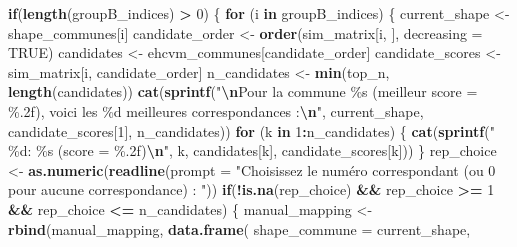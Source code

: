 \documentclass[
]{article}
\newenvironment{Shaded}{\begin{snugshade}}{\end{snugshade}}
\newcommand{\AttributeTok}[1]{\textcolor[rgb]{0.13,0.29,0.53}{#1}}
\newcommand{\ConstantTok}[1]{\textcolor[rgb]{0.56,0.35,0.01}{#1}}
\newcommand{\ControlFlowTok}[1]{\textcolor[rgb]{0.13,0.29,0.53}{\textbf{#1}}}
\newcommand{\DecValTok}[1]{\textcolor[rgb]{0.00,0.00,0.81}{#1}}
\newcommand{\FunctionTok}[1]{\textcolor[rgb]{0.13,0.29,0.53}{\textbf{#1}}}
\newcommand{\NormalTok}[1]{#1}
\newcommand{\OtherTok}[1]{\textcolor[rgb]{0.56,0.35,0.01}{#1}}
\newcommand{\SpecialCharTok}[1]{\textcolor[rgb]{0.81,0.36,0.00}{\textbf{#1}}}
\newcommand{\StringTok}[1]{\textcolor[rgb]{0.31,0.60,0.02}{#1}}
\begin{document}
\begin{Shaded}
\begin{Highlighting}[]
  \ControlFlowTok{if}\NormalTok{(}\FunctionTok{length}\NormalTok{(groupB\_indices) }\SpecialCharTok{\textgreater{}} \DecValTok{0}\NormalTok{) \{}
    \ControlFlowTok{for}\NormalTok{ (i }\ControlFlowTok{in}\NormalTok{ groupB\_indices) \{}
\NormalTok{      current\_shape }\OtherTok{\textless{}{-}}\NormalTok{ shape\_communes[i]}
\NormalTok{      candidate\_order }\OtherTok{\textless{}{-}} \FunctionTok{order}\NormalTok{(sim\_matrix[i, ], }\AttributeTok{decreasing =} \ConstantTok{TRUE}\NormalTok{)}
\NormalTok{      candidates }\OtherTok{\textless{}{-}}\NormalTok{ ehcvm\_communes[candidate\_order]}
\NormalTok{      candidate\_scores }\OtherTok{\textless{}{-}}\NormalTok{ sim\_matrix[i, candidate\_order]}
\NormalTok{      n\_candidates }\OtherTok{\textless{}{-}} \FunctionTok{min}\NormalTok{(top\_n, }\FunctionTok{length}\NormalTok{(candidates))}
      \FunctionTok{cat}\NormalTok{(}\FunctionTok{sprintf}\NormalTok{(}\StringTok{"}\SpecialCharTok{\textbackslash{}n}\StringTok{Pour la commune \textquotesingle{}\%s\textquotesingle{} (meilleur score = \%.2f), }
\StringTok{                  voici les \%d meilleures correspondances :}\SpecialCharTok{\textbackslash{}n}\StringTok{"}\NormalTok{, }
\NormalTok{                  current\_shape, candidate\_scores[}\DecValTok{1}\NormalTok{], n\_candidates))}
      \ControlFlowTok{for}\NormalTok{ (k }\ControlFlowTok{in} \DecValTok{1}\SpecialCharTok{:}\NormalTok{n\_candidates) \{}
        \FunctionTok{cat}\NormalTok{(}\FunctionTok{sprintf}\NormalTok{(}\StringTok{"  \%d: \textquotesingle{}\%s\textquotesingle{} (score = \%.2f)}\SpecialCharTok{\textbackslash{}n}\StringTok{"}\NormalTok{, k, candidates[k],}
\NormalTok{                    candidate\_scores[k]))}
\NormalTok{      \}}
\NormalTok{      rep\_choice }\OtherTok{\textless{}{-}} \FunctionTok{as.numeric}\NormalTok{(}\FunctionTok{readline}\NormalTok{(}\AttributeTok{prompt =} \StringTok{"Choisissez le numéro }
\StringTok{                                        correspondant (ou 0 pour aucune }
\StringTok{                                        correspondance) : "}\NormalTok{))}
      \ControlFlowTok{if}\NormalTok{(}\SpecialCharTok{!}\FunctionTok{is.na}\NormalTok{(rep\_choice) }\SpecialCharTok{\&\&}\NormalTok{ rep\_choice }\SpecialCharTok{\textgreater{}=} \DecValTok{1} \SpecialCharTok{\&\&}\NormalTok{ rep\_choice }\SpecialCharTok{\textless{}=}\NormalTok{ n\_candidates) \{}
\NormalTok{        manual\_mapping }\OtherTok{\textless{}{-}} \FunctionTok{rbind}\NormalTok{(manual\_mapping, }\FunctionTok{data.frame}\NormalTok{(}
          \AttributeTok{shape\_commune =}\NormalTok{ current\_shape,}

\end{Highlighting}
\end{Shaded}
\end{document}
